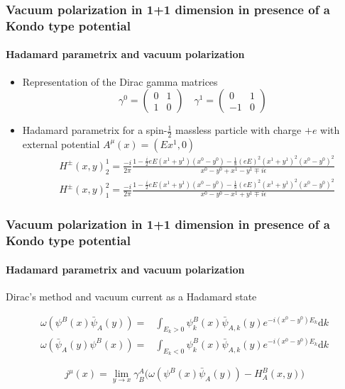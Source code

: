 \documentclass[french]{beamer}
\newcommand{\dd}[0]{\textrm{d}}
\begin{document}
\begin{frame}[shrink=20]
\frametitle{Vacuum polarization in 1+1 dimension in presence of a Kondo type potential}
\framesubtitle{Hadamard parametrix and vacuum polarization}

\begin{itemize}
\item Representation of the Dirac gamma matrices
\begin{equation*}
\gamma^0 = \begin{pmatrix}
0 & 1 \\
1 & 0 \end{pmatrix}  \quad  \gamma^1 = \begin{pmatrix}
0  & 1 \\
-1 & 0
\end{pmatrix}
\end{equation*}

\item Hadamard parametrix for a spin-$\frac 1 2$ massless particle with charge $+e$ with external potential $A^\mu(x) = (Ex^1, 0 )$
\begin{equation*}
\begin{split}
& H^\pm (x, y)^1_2 = \frac{-i}{2\pi}\frac{1-\frac i 2 e E(x^1 + y^1)(x^0-y^0) 
- \frac 1 8 (eE)^2(x^1 + y^1)^2(x^0 - y^0)^2}{x^0 - y^0 + x^1 - y^1 \mp i \epsilon}  \\
& H^\pm (x, y)^2_1 = \frac{-i}{2\pi}\frac{1-\frac i 2 e E(x^1 + y^1)(x^0-y^0) 
- \frac 1 8 (eE)^2(x^1 + y^1)^2(x^0 - y^0)^2}{x^0 - y^0 - x^1 + y^1 \mp i \epsilon}
\end{split}
\end{equation*}

\end{itemize}

\end{frame}
\begin{frame}
\frametitle{Vacuum polarization in 1+1 dimension in presence of a Kondo type potential}
\framesubtitle{Hadamard parametrix and vacuum polarization}

 Dirac's method and vacuum current as a Hadamard state

\begin{equation*}
\begin{split}
\omega(\psi^B(x)\bar{\psi}_A(y)) = & \int_{E_k >0} \psi_k^B(x)\bar{\psi}_{A,k}(y)e^{-i(x^0-y^0)E_k} \dd k \\
\omega(\bar{\psi}_A(y)\psi^B(x)) = & \int_{E_k <0} \psi_k^B(x)\bar{\psi}_{A,k}(y)e^{-i(x^0-y^0)E_k} \dd k 
\end{split}
\end{equation*}

\begin{equation*}
j^\mu(x) = \lim_{y \rightarrow x} \gamma^A_B \big(
\omega(\psi^B(x)\bar{\psi}_A(y)) - H^B_A (x, y)\big)
\end{equation*}

\end{frame}
\end{document}
